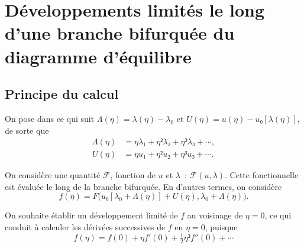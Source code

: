 \documentclass[12pt, final]{amsart}
\begin{document}
\section{Développements limités le long d'une branche bifurquée du diagramme
  d'équilibre}

\subsection{Principe du calcul}

On pose dans ce qui suit \(\Lambda(η)=\lambda(η)-\lambda_0\) et
\(U(η)=u(η)-u₀[\lambda(η)]\), de sorte que
\begin{align}
  \label{eq:20211112155446}
  \Lambda(η)&=η\lambda₁+η²\lambda₂+η³\lambda₃+\cdots,\\
  \label{eq:20211112113028}
  U(η)&=η u₁+η² u₂+η³u₃+\cdots.
\end{align}

On considère une quantité \(\mathcal F\), fonction de \(u\) et \(\lambda\)~:
\(\mathcal F(u, \lambda)\). Cette fonctionnelle est évaluée le long de la
branche bifurquée. En d'autres termes, on considère
\begin{equation}
  f(η)=F\bigl(u₀[\lambda_0+\Lambda(η)]+U(η),
  \lambda_0+\Lambda(η)\bigr).
\end{equation}

On souhaite établir un développement limité de \(f\) au voisinage de
\(η=0\), ce qui conduit à calculer les dérivées successives de \(f\) en
\(η=0\), puisque
\begin{equation}
  f(η)=f(0)+η f'(0)+\tfrac12η²f''(0)+\cdots
\end{equation}
\end{document}
